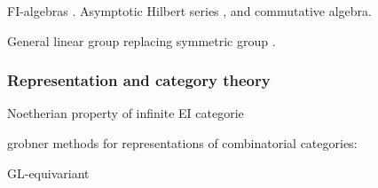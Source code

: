FI-algebras \cite{church2014fi, church2015fi}.  Asymptotic Hilbert series \cite{Nagel}, \cite{krone2016hilbert} and commutative algebra. 

General linear group replacing symmetric group \cite{sam2016gl}.

\subsubsection{Representation and category theory}

Noetherian property of infinite EI categorie \cite{gan2015noetherian}

\cite{putman2014representation}

grobner methods for representations of combinatorial categories: \cite{sam2016grobner}

GL-equivariant \cite{sam2016gl}




